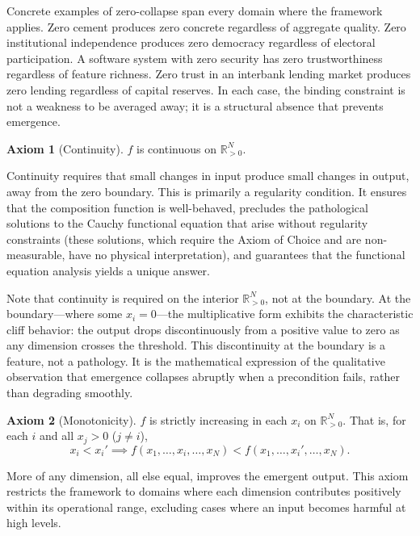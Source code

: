\documentclass[12pt, a4paper]{article}
\theoremstyle{definition}
\newtheorem{axiom}{Axiom}
\theoremstyle{remark}
\newcommand{\Rp}{\mathbb{R}_{>0}}
\begin{document}
Concrete examples of zero-collapse span every domain where the framework applies. Zero cement produces zero concrete regardless of aggregate quality. Zero institutional independence produces zero democracy regardless of electoral participation. A software system with zero security has zero trustworthiness regardless of feature richness. Zero trust in an interbank lending market produces zero lending regardless of capital reserves. In each case, the binding constraint is not a weakness to be averaged away; it is a structural absence that prevents emergence.

\begin{axiom}[Continuity]\label{ax:cont}
$f$ is continuous on $\Rp^N$.
\end{axiom}

\noindent Continuity requires that small changes in input produce small changes in output, away from the zero boundary. This is primarily a regularity condition. It ensures that the composition function is well-behaved, precludes the pathological solutions to the Cauchy functional equation that arise without regularity constraints (these solutions, which require the Axiom of Choice and are non-measurable, have no physical interpretation), and guarantees that the functional equation analysis yields a unique answer.

Note that continuity is required on the interior $\Rp^N$, not at the boundary. At the boundary---where some $x_i = 0$---the multiplicative form exhibits the characteristic cliff behavior: the output drops discontinuously from a positive value to zero as any dimension crosses the threshold. This discontinuity at the boundary is a feature, not a pathology. It is the mathematical expression of the qualitative observation that emergence collapses abruptly when a precondition fails, rather than degrading smoothly.

\begin{axiom}[Monotonicity]\label{ax:mono}
$f$ is strictly increasing in each $x_i$ on $\Rp^N$. That is, for each $i$ and all $x_j > 0$ ($j \neq i$),
\[
x_i < x_i' \implies f(x_1, \ldots, x_i, \ldots, x_N) < f(x_1, \ldots, x_i', \ldots, x_N).
\]
\end{axiom}

\noindent More of any dimension, all else equal, improves the emergent output. This axiom restricts the framework to domains where each dimension contributes positively within its operational range, excluding cases where an input becomes harmful at high levels.
\end{document}
